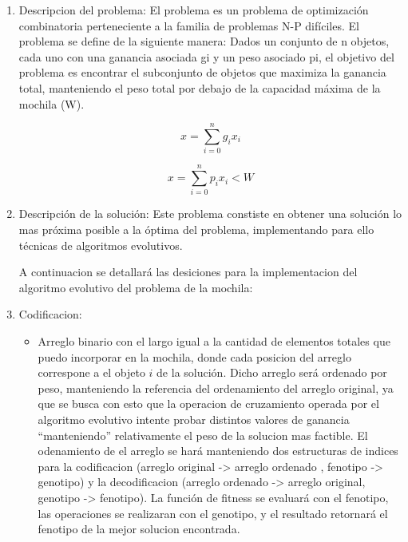 \documentclass[9pt,conference]{IEEEtran}
\begin{document}
	\begin{enumerate}
	\item Descripcion del problema:
	El problema es un problema de optimización combinatoria perteneciente a la familia de problemas N-P difíciles. El problema se define de la siguiente manera:
	Dados un conjunto de n objetos, cada uno con una ganancia asociada gi y un peso asociado pi, el objetivo del problema es encontrar el subconjunto de objetos que maximiza la ganancia total, manteniendo el peso total por debajo de la capacidad máxima de la mochila (W).	
	
	\begin{equation}
	\label{eqn_tot_gain}
	x = \sum\limits_{i=0}^{n} g_{i}x_{i}
	\end{equation}

	\begin{equation}
	\label{eqn_tot_peso}
	x = \sum\limits_{i=0}^{n} p_{i}x_{i} < W
	\end{equation}

	
	\item Descripción de la solución:
		Este problema constiste en obtener una solución lo mas próxima posible a la óptima del problema, implementando para ello técnicas de algoritmos evolutivos.
	
		A continuacion se detallará las desiciones para la implementacion del algoritmo evolutivo del problema de la mochila:
	
	\item Codificacion:
		\begin{itemize}	

		\item Arreglo binario con el largo igual a la cantidad de elementos totales que puedo incorporar en la mochila, donde cada posicion del arreglo correspone a el objeto $i$ de la solución. Dicho arreglo será ordenado por peso, manteniendo la referencia del ordenamiento del arreglo original, ya que se busca con esto que la operacion de cruzamiento operada por el algoritmo evolutivo intente probar distintos valores de ganancia ``manteniendo'' relativamente el peso de la solucion mas factible.
		El odenamiento de el arreglo se hará manteniendo dos estructuras de indices para la codificacion (arreglo original -> arreglo ordenado , fenotipo -> genotipo) y la decodificacion (arreglo ordenado -> arreglo original, genotipo -> fenotipo).
		La función de fitness se evaluará con el fenotipo, las operaciones se realizaran con el genotipo, y el resultado retornará el fenotipo de la mejor solucion encontrada.


\end{itemize}
\end{enumerate}
\end{document}
